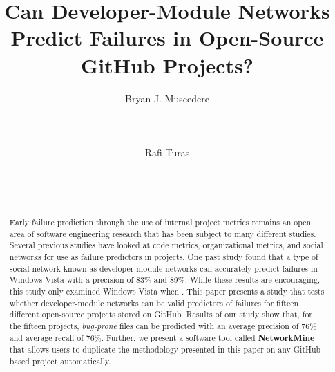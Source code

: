 \documentclass{sig-alternate-05-2015}
\begin{document}

\title{Can Developer-Module Networks Predict Failures in Open-Source GitHub Projects?}


\author{
\alignauthor
Bryan J. Muscedere\\
       \\
       \\
       \\
\alignauthor
Rafi Turas\\
       \\
       \\
       \\
       }
\maketitle

\begin{abstract}
Early failure prediction through the use of internal project metrics remains an open area of software engineering research that has been subject to many different studies. Several previous studies have looked at code metrics, organizational metrics, and social networks for use as failure predictors in projects. One past study found that a type of social network known as developer-module networks can accurately predict failures in Windows Vista with a precision of 83\% and 89\%. While these results are encouraging, this study only examined Windows Vista when . This paper presents a study that tests whether developer-module networks can be valid predictors of failures for fifteen different open-source projects stored on GitHub. Results of our study show that, for the fifteen projects, \textit{bug-prone} files can be predicted with an average precision of 76\% and average recall of 76\%. Further, we present a software tool called \textbf{NetworkMine} that allows users to duplicate the methodology presented in this paper on any GitHub based project automatically.
\end{abstract}
\end{document}
